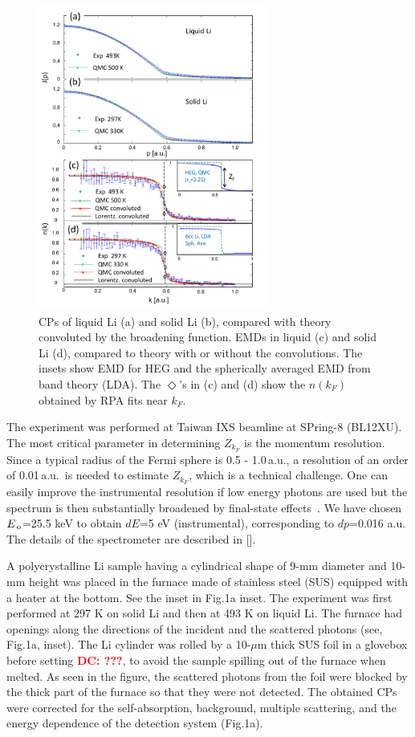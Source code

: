 \documentclass[twocolumn,showpacs,showkeys,fleqn,prl,superscriptaddress]{revtex4}%
\newcommand{\nn}[1]{\textnormal{ #1}}
\newcommand{\dc}[1]{\textcolor{red}{\textbf{DC: #1}}}
\begin{document}
\begin{figure}
\includegraphics[bb= 50 10 500 720, width=7.5cm]{fig2.pdf}
\caption{CPs of liquid Li (a) and solid Li (b), compared with theory convoluted by the broadening function.  EMDs in liquid (c) and solid Li (d), compared to theory with or without the convolutions. The insets show EMD for HEG and the spherically averaged EMD from band theory (LDA). The $\Diamond$'s in (c) and (d)  show the $n(k_F)$ obtained by RPA fits near $k_F$.}
\label{Fig.2}
\end{figure}

The experiment was performed at Taiwan IXS beamline at SPring-8 (BL12XU).
The most critical parameter in determining $Z_{k_F}$ is the momentum resolution.
Since a typical radius of the Fermi sphere is 0.5 - 1.0\,a.u., a resolution of an order of 0.01\,a.u.\, is needed to estimate $Z_{k_F}$, which is a technical challenge.
One can easily improve the instrumental resolution if low energy photons are used but the spectrum is then substantially broadened by final-state effects~\cite{stern00,soi01}.
We have chosen $E_{\nn{\!o}}$=25.5 keV to obtain $dE$=5 eV (instrumental), corresponding to $dp$=0.016 a.u.
The details of the spectrometer are described in [].

A polycrystalline Li sample having a cylindrical shape of 9-mm diameter and 10-mm height was placed in the furnace made of stainless steel (SUS) equipped with a heater at the bottom. See the inset in Fig.1a inset.
The experiment was first performed at 297 K on solid Li and then at 493 K on liquid Li.
The furnace had openings along the directions of the incident and the scattered photons (see, Fig.1a, inset).
The Li cylinder was rolled by a 10-$\mu$m thick SUS foil in a glovebox before setting \dc{???}, to avoid the sample spilling out of the furnace when melted.
As seen in the figure, the scattered photons from the foil were blocked by the thick part of the furnace so that they were not detected.
The obtained CPs were corrected for the self-absorption, background, multiple scattering, and the energy dependence of the detection system (Fig.1a).
\end{document}
